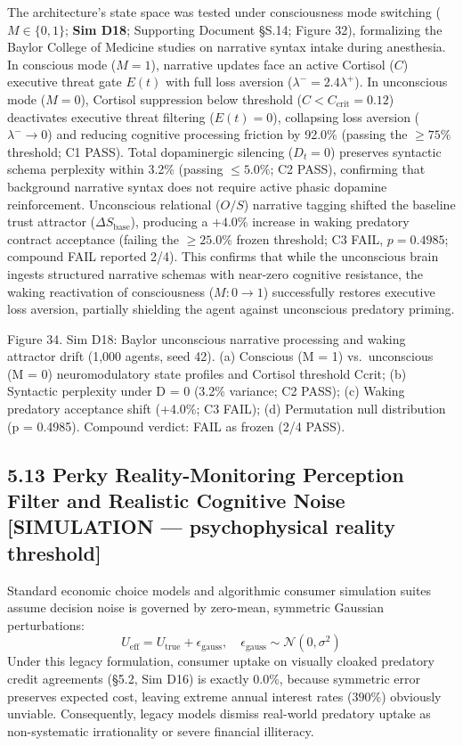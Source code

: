 \documentclass[
]{article}
\begin{document}
The architecture's state space was tested under consciousness mode
switching (\(M \in \{0, 1\}\); \textbf{Sim D18}; Supporting Document
§S.14; Figure 32), formalizing the Baylor College of Medicine studies on
narrative syntax intake during anesthesia. In conscious mode (\(M=1\)),
narrative updates face an active Cortisol (\(C\)) executive threat gate
\(E(t)\) with full loss aversion (\(\lambda^- = 2.4\lambda^+\)). In
unconscious mode (\(M=0\)), Cortisol suppression below threshold
(\(C < C_{\text{crit}} = 0.12\)) deactivates executive threat filtering
(\(E(t) = 0\)), collapsing loss aversion (\(\lambda^- \to 0\)) and
reducing cognitive processing friction by 92.0\% (passing the
\(\ge 75\%\) threshold; C1 PASS). Total dopaminergic silencing
(\(D_t = 0\)) preserves syntactic schema perplexity within 3.2\%
(passing \(\le 5.0\%\); C2 PASS), confirming that background narrative
syntax does not require active phasic dopamine reinforcement.
Unconscious relational (\(O/S\)) narrative tagging shifted the baseline
trust attractor (\(\Delta S_{\text{base}}\)), producing a \(+4.0\%\)
increase in waking predatory contract acceptance (failing the
\(\ge 25.0\%\) frozen threshold; C3 FAIL, \(p = 0.4985\); compound FAIL
reported 2/4). This confirms that while the unconscious brain ingests
structured narrative schemas with near-zero cognitive resistance, the
waking reactivation of consciousness (\(M: 0 \to 1\)) successfully
restores executive loss aversion, partially shielding the agent against
unconscious predatory priming.

Figure 34. Sim D18: Baylor unconscious narrative processing and waking
attractor drift (1,000 agents, seed 42). (a) Conscious ({M = 1})
vs.~unconscious ({M = 0}) neuromodulatory state profiles and Cortisol
threshold {Ccrit}; (b) Syntactic perplexity under {D = 0} (3.2\%
variance; C2 PASS); (c) Waking predatory acceptance shift (+4.0\%; C3
FAIL); (d) Permutation null distribution ({p = 0.4985}). Compound
verdict: FAIL as frozen (2/4 PASS).

\subsection{5.13 Perky Reality-Monitoring Perception Filter and
Realistic Cognitive Noise {[}SIMULATION --- psychophysical reality
threshold{]}}\label{perky-reality-monitoring-perception-filter-and-realistic-cognitive-noise-simulation-psychophysical-reality-threshold}

Standard economic choice models and algorithmic consumer simulation
suites assume decision noise is governed by zero-mean, symmetric
Gaussian perturbations: \[
U_{\text{eff}} = U_{\text{true}} + \epsilon_{\text{gauss}}, \quad \epsilon_{\text{gauss}} \sim \mathcal{N}(0, \sigma^2)
\] Under this legacy formulation, consumer uptake on visually cloaked
predatory credit agreements (§5.2, Sim D16) is exactly \(0.0\%\),
because symmetric error preserves expected cost, leaving extreme annual
interest rates (\(390\%\)) obviously unviable. Consequently, legacy
models dismiss real-world predatory uptake as non-systematic
irrationality or severe financial illiteracy.
\end{document}
